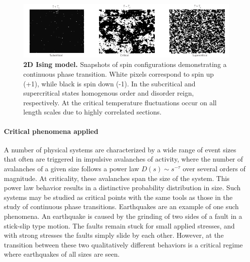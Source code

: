 \documentclass[12pt]{article}
\begin{document}
\begin{figure}      
  \begin{center}    
 \includegraphics[width=1.1\textwidth]{Isingchialvo}    
    \caption{\textbf{2D Ising model.} Snapshots of spin configurations demonstrating a continuous phase transition. White pixels correspond to spin up (+1), while black is spin down (-1). In the subcritical and supercritical states homogenous order and disorder reign, respectively. At the critical temperature fluctuations occur on all length scales due to highly correlated sections. \cite{Chialvo2010a}}   
   \label{Figure::Ising model criticality}   
  \end{center}     
   \end{figure}
   


\paragraph*{Critical phenomena applied}

A number of physical systems are characterized by a wide range of event sizes that often are triggered in impulsive avalanches of activity, where the number of avalanches of a given size follows a power law $ D(s) \sim s^{-\tau} $ over several orders of magnitude. At criticality, these avalanches span the size of the system. This power law behavior results in a distinctive probability distribution in size. Such systems may be studied as critical points with the same tools as those in the study of continuous phase transitions. Earthquakes are an example of one such phenomena\cite{Sethna2011a}. An earthquake is caused by the grinding of two sides of a fault in a stick-slip type motion. The faults remain stuck for small applied stresses, and with strong stresses the faults simply slide by each other. However, at the transition between these two qualitatively different behaviors is a critical regime where earthquakes of all sizes are seen.  
\end{document}
